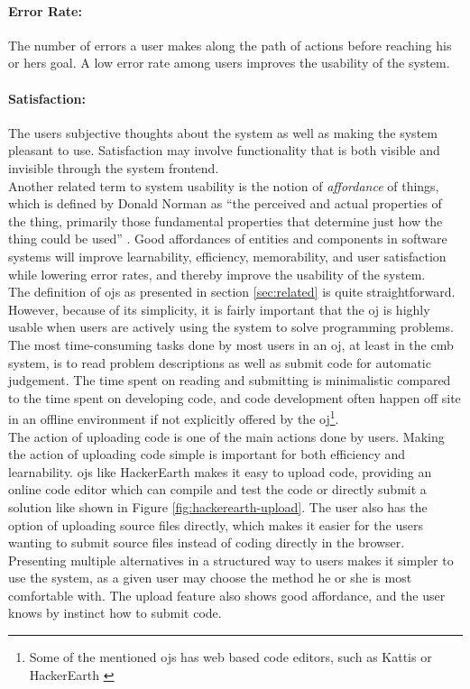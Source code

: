 \paragraph*{Error Rate:} The number of errors a user makes along the path of actions before reaching his or hers goal. A low error rate among users improves the usability of the system.

\paragraph*{Satisfaction:} The users subjective thoughts about the system as well as making the system pleasant to use. Satisfaction may involve functionality that is both visible and invisible through the system frontend. \\

Another related term to system usability is the notion of \textit{affordance} of things, which is defined by Donald Norman as ``the perceived and actual properties of the thing, primarily those fundamental properties that determine just how the thing could be used'' \cite{norman1988design}. Good affordances of entities and components in software systems will improve learnability, efficiency, memorability, and user satisfaction while lowering error rates, and thereby improve the usability of the system. \\

The definition of \glspl{oj} as presented in section \ref{sec:related} is quite straightforward. However, because of its simplicity, it is fairly important that the \gls{oj} is highly usable when users are actively using the system to solve programming problems. The most time-consuming tasks done by most users in an \gls{oj}, at least in the \gls{cmb} system, is to read problem descriptions as well as submit code for automatic judgement. The time spent on reading and submitting is minimalistic compared to the time spent on developing code, and code development often happen off site in an offline environment if not explicitly offered by the \gls{oj}\footnote{Some of the mentioned \glspl{oj} has web based code editors, such as Kattis \cite{KATTIS} or HackerEarth \cite{HACKEREARTH}}. \\

The action of uploading code is one of the main actions done by users. Making the action of uploading code simple is important for both efficiency and learnability. \glspl{oj} like HackerEarth makes it easy to upload code, providing an online code editor which can compile and test the code or directly submit a solution like shown in Figure \ref{fig:hackerearth-upload}. The user also has the option of uploading source files directly, which makes it easier for the users wanting to submit source files instead of coding directly in the browser. Presenting multiple alternatives in a structured way to users makes it simpler to use the system, as a given user may choose the method he or she is most comfortable with. The upload feature also shows good affordance, and the user knows by instinct how to submit code. \\

